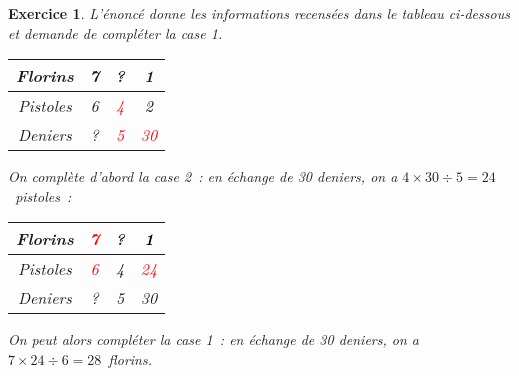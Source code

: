 \documentclass[10pt]{article}
\newtheorem{exo}{Exercice}
\begin{document}
\begin{exo}

L'énoncé donne les informations recensées dans le tableau ci-dessous et demande de compléter la case \textcircled{\small{1}}.

\begin{center}
\begin{tabular}{|c|c|c|c|}\hline
Florins& 7&?&\textcircled{\small{1}} \\ \hline 
Pistoles&6& \textcolor{red}{4}&\textcircled{\small{\textcolor{black}{2}}} \\ \hline
Deniers&?& \textcolor{red}{5}&\textcolor{red}{30} \\ \hline
\end{tabular}
\end{center}

On complète d'abord la case \textcircled{\small{2}}~: en échange de 30 deniers, on a $4\times 30\div 5=24$~pistoles~:

\begin{center}
\begin{tabular}{|c|c|c|c|}\hline
Florins& \textcolor{red}{7}&?&\textcircled{\small{\textcolor{black}{1}}} \\ \hline 
Pistoles&\textcolor{red}{6}& 4&\textcolor{red}{24} \\ \hline
Deniers&?& 5&30 \\ \hline
\end{tabular}
\end{center}

On peut alors compléter la case \textcircled{\small{1}}~: en échange de 30 deniers, on a $7\times 24\div 6=28$~florins.

\end{exo}
\end{document}
